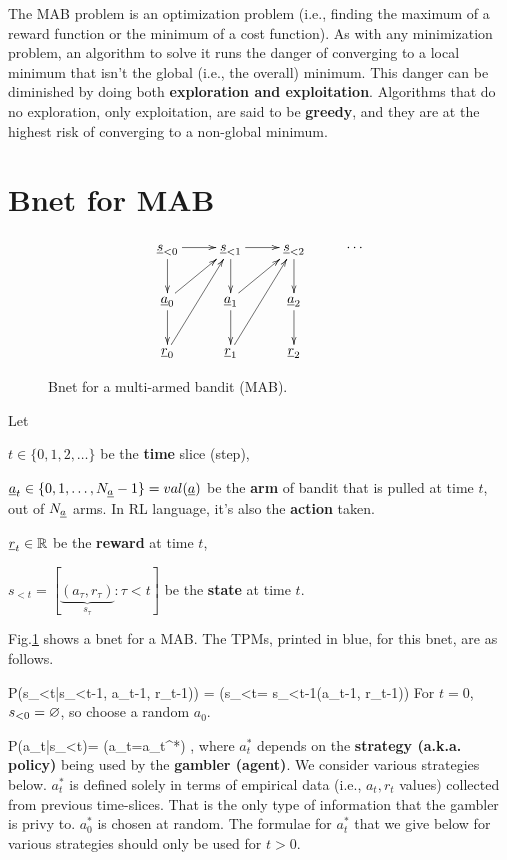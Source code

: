 The MAB problem is
an optimization problem (i.e., 
finding the maximum of 
a reward  function
or the minimum of a cost function).
As with any minimization problem,
an algorithm to solve it
runs the danger of
converging
to a local minimum
that isn't the global (i.e., 
the overall) minimum.
This danger can be diminished 
by doing both {\bf exploration
and exploitation}.
Algorithms that do no exploration,
only exploitation,
are said to be {\bf greedy},
and they are at the highest 
risk of converging to a non-global minimum.


\section{Bnet for MAB}
\begin{figure}[h!]
\centering
$$\xymatrix{
\rvs_{<0}\ar[r]\ar[d]&
\rvs_{<1}\ar[r]\ar[d]&
\rvs_{<2}\ar[d]&\cdots\\
\rva_0\ar[ur]\ar[d]&
\rva_1\ar[ur]\ar[d]&
\rva_2\ar[d]
\\
\rvr_0\ar[uur]&
\rvr_1\ar[uur]&
\rvr_2
}$$
\caption{Bnet for a multi-armed bandit (MAB).}
\label{fig-mab-bnet}
\end{figure}

Let 

$t\in \{0,1, 2, \ldots\}$ be the {\bf time}
 slice (step),

$\rva_t\in \{0, 1, \ldots, N_\rva-1\}=val(\rva)$
 be the {\bf arm} of bandit
that is pulled at time $t$, out of $N_\rva$ arms.
In RL language, it's also the {\bf action} taken.

$\rvr_t\in \RR$ be the {\bf reward} at time $t$,


$s_{<t} = [\underbrace{
(a_\tau, r_\tau)}_{s_\tau}: \tau<t]$
be the {\bf state} at time $t$.

Fig.\ref{fig-mab-bnet}
shows a bnet 
for a MAB.
The TPMs, printed in blue,
for this bnet, are as follows.


\beq\color{blue}
P(s_{<t}|s_{<t-1}, a_{t-1}, r_{t-1})) = 
\indi(s_{<t}= s_{<t-1}\cup (a_{t-1}, r_{t-1}))
\eeq
For $t=0$, $s_{<0}=\varnothing$, so
 choose a random $a_0$.

\beq\color{blue}
P(a_t|s_{<t})= \indi(a_t=a_t^*)
\;\;
\;,
\eeq
where $a^*_t$ depends on the
 {\bf strategy (a.k.a. policy)} being used
by the {\bf gambler (agent)}.
We consider various
strategies below.
$a^*_t$ is defined
solely in terms
of empirical data
(i.e., $a_t, r_t$
values)
collected from previous 
time-slices.
That is the only  type of
information that
the gambler 
is privy to.
$a_0^*$ is chosen at random.
The formulae for $a_t^*$
that we give below 
for various strategies
should only be used for $t>0$.

